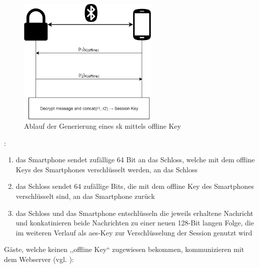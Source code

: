 		\begin{figure}[H]
    		\centering
    		\includegraphics[width=0.6\textwidth]{graphics/owner_key.png}
    		\caption{Ablauf der Generierung eines \gls{sk} mittels offline Key\cite{Fuller2017}}
    		\label{fig:owner_key}
    	\end{figure}
		
		\noindent{}:
        \begin{enumerate}[noitemsep]
            \item das Smartphone sendet zufällige 64 Bit an das Schloss, welche mit dem offline Keys des Smartphones verschlüsselt werden, an das Schloss
            \item das Schloss sendet 64 zufällige Bits, die mit dem offline Key des Smartphones verschlüsselt sind, an das Smartphone zurück
            \item das Schloss und das Smartphone entschlüsseln die jeweils erhaltene Nachricht und konkatinieren beide Nachrichten zu einer neuen 128-Bit langen Folge, die im weiteren Verlauf als \gls{aes}-Key zur Verschlüsselung der Session genutzt wird
        \end{enumerate}
        
        \noindent Gäste, welche keinen ,,offline Key`` zugewiesen bekommen, kommunizieren mit dem Webserver (vgl. ):
        

